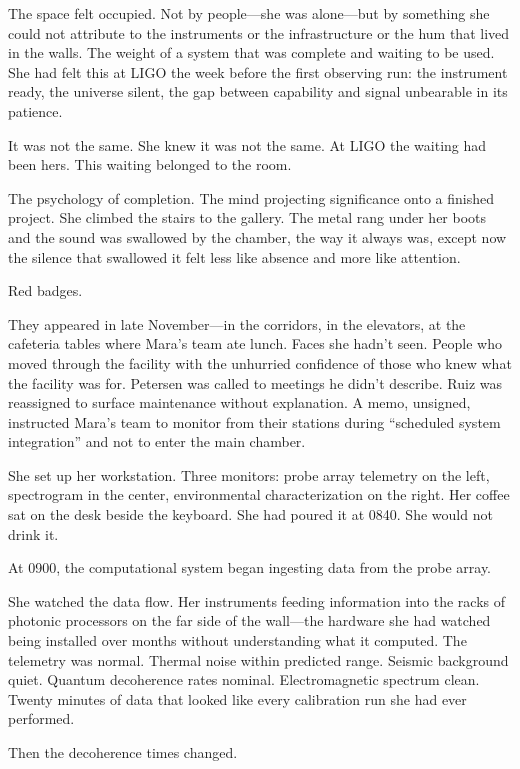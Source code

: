 The space felt occupied. Not by people---she was alone---but by something she could not attribute to the instruments or the infrastructure or the hum that lived in the walls. The weight of a system that was complete and waiting to be used. She had felt this at LIGO the week before the first observing run: the instrument ready, the universe silent, the gap between capability and signal unbearable in its patience.

It was not the same. She knew it was not the same. At LIGO the waiting had been hers. This waiting belonged to the room.

The psychology of completion. The mind projecting significance onto a finished project. She climbed the stairs to the gallery. The metal rang under her boots and the sound was swallowed by the chamber, the way it always was, except now the silence that swallowed it felt less like absence and more like attention.

\scenebreak

Red badges.

They appeared in late November---in the corridors, in the elevators, at the cafeteria tables where Mara's team ate lunch. Faces she hadn't seen. People who moved through the facility with the unhurried confidence of those who knew what the facility was for. Petersen was called to meetings he didn't describe. Ruiz was reassigned to surface maintenance without explanation. A memo, unsigned, instructed Mara's team to monitor from their stations during ``scheduled system integration'' and not to enter the main chamber.

She set up her workstation. Three monitors: probe array telemetry on the left, spectrogram in the center, environmental characterization on the right. Her coffee sat on the desk beside the keyboard. She had poured it at 0840. She would not drink it.

At 0900, the computational system began ingesting data from the probe array.

She watched the data flow. Her instruments feeding information into the racks of photonic processors on the far side of the wall---the hardware she had watched being installed over months without understanding what it computed. The telemetry was normal. Thermal noise within predicted range. Seismic background quiet. Quantum decoherence rates nominal. Electromagnetic spectrum clean. Twenty minutes of data that looked like every calibration run she had ever performed.

Then the decoherence times changed.

